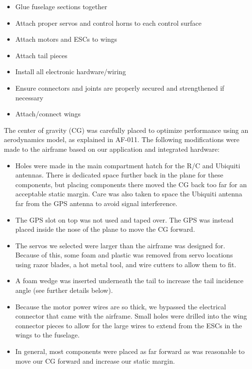 \documentclass[]{auvsi_doc}
\begin{document}
\begin{itemize}
	\item Glue fuselage sections together
	\item Attach proper servos and control horns to each control surface
	\item Attach motors and ESCs to wings
	\item Attach tail pieces
	\item Install all electronic hardware/wiring
	\item Ensure connectors and joints are properly secured and strengthened if necessary
	\item Attach/connect wings
\end{itemize}

The center of gravity (CG) was carefully placed to optimize performance using an aerodynamics model, as explained in AF-011. The following modifications were made to the airframe based on our application and integrated hardware:

\begin{itemize}
	\item Holes were made in the main compartment hatch for the R/C and Ubiquiti antennas. There is dedicated space further back in the plane for these components, but placing components there moved the CG back too far for an acceptable static margin. Care was also taken to space the Ubiquiti antenna far from the GPS antenna to avoid signal interference.
	\item The GPS slot on top was not used and taped over. The GPS was instead placed inside the nose of the plane to move the CG forward.
	\item The servos we selected were larger than the airframe was designed for. Because of this, some foam and plastic was removed from servo locations using razor blades, a hot metal tool, and wire cutters to allow them to fit.
	\item A foam wedge was inserted underneath the tail to increase the tail incidence angle (see further details below).
	\item Because the motor power wires are so thick, we bypassed the electrical connector that came with the airframe. Small holes were drilled into the wing connector pieces to allow for the large wires to extend from the ESCs in the wings to the fuselage.
	\item In general, most components were placed as far forward as was reasonable to move our CG forward and increase our static margin.
\end{itemize}
\end{document}
